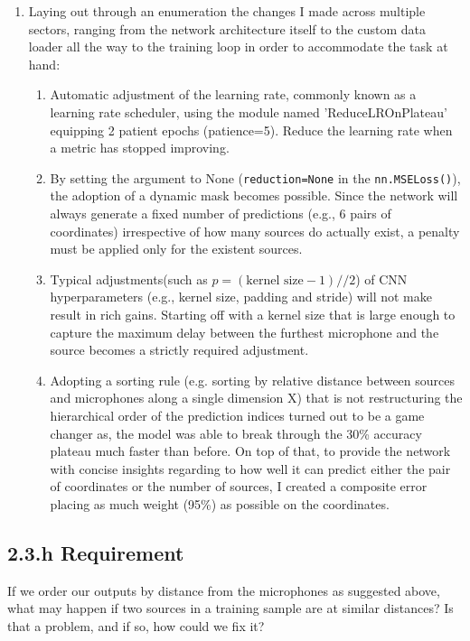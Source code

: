 \documentclass{vgtc}                          %
\begin{document}
\begin{enumerate}
    \item Laying out through an enumeration the changes I made across multiple sectors, ranging from the network architecture itself to the custom data loader all the way to the training loop in order to accommodate the task at hand:
\begin{enumerate}
    \item Automatic adjustment of the learning rate, commonly known as a learning rate scheduler, using the module named 'ReduceLROnPlateau' equipping 2 patient epochs (patience=5). Reduce the learning rate when a metric has stopped improving.
    \item By setting the argument to None (\lstinline|reduction=None| in the \lstinline|nn.MSELoss()|), the adoption of a dynamic mask becomes possible. Since the network will always generate a fixed number of predictions (e.g., 6 pairs of coordinates) irrespective of how many sources do actually exist, a penalty must be applied only for the existent sources.
    \item Typical adjustments(such as $p=(\text{kernel size}-1)//2$) of CNN hyperparameters (e.g., kernel size, padding and stride) will not make result in rich gains. Starting off with a kernel size that is large enough to capture the maximum delay between the furthest microphone and the source becomes a strictly required adjustment. 
    \item Adopting a sorting rule (e.g. sorting by relative distance between sources and microphones along a single dimension X) that is not restructuring the hierarchical order of the prediction indices turned out to be a game changer as, the model was able to break through the 30\% accuracy plateau much faster than before. On top of that, to provide the network with concise insights regarding to how well it can predict either the pair of coordinates or the number of sources, I created a composite error placing as much weight (95\%) as possible on the coordinates.
\end{enumerate}


\end{enumerate}

\subsection{2.3.h Requirement}
 If we order our outputs by distance from the microphones as suggested above, what
may happen if two sources in a training sample are at similar distances? Is that a
problem, and if so, how could we fix it?
\end{document}
